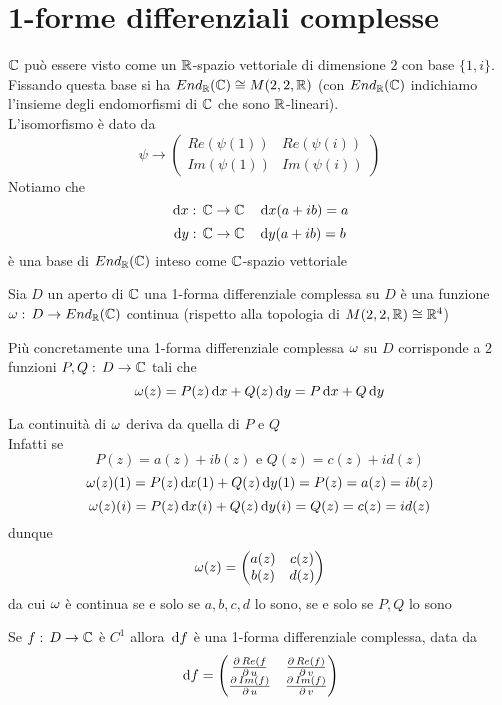 \section{1-forme differenziali complesse}
$\mathbb{C}$ pu\`o essere visto come un $\mathbb{R}$-spazio vettoriale di dimensione $2$ con base $\{ 1 , i\}$.\\
Fissando questa base si ha $End_{\mathbb{R}}(\mathbb{C})\cong M(2,2,\mathbb{R})$ (con $End_{\mathbb{R}}(\mathbb{C})$ indichiamo l'insieme degli endomorfismi di $\mathbb{C}$ che sono $\mathbb{R}$-lineari).\\
L'isomorfismo \`e dato da 
$$\psi \to \begin{pmatrix}
Re (\psi(1)) & Re (\psi(i)) \\
Im(\psi(1)) & Im(\psi(i))
\end{pmatrix}$$
Notiamo che 
$$\, \mathrm{d} x:\, \mathbb{C}\to \mathbb{C} \quad \, \mathrm{d} x(a+ib)=a$$
$$\mathrm{d}y:\, \mathbb{C}\to \mathbb{C} \quad \, \mathrm{d} y(a+ib)=b$$
\`e una base di $End_{\mathbb{R}}(\mathbb{C})$ inteso come $\mathbb{C}$-spazio vettoriale
\begin{defn}Sia $D$ un aperto di $\mathbb{C}$ una 1-forma differenziale complessa su $D$ \`e una funzione 
$\omega:\,D \to End_{\mathbb{R}}(\mathbb{C})$ continua (rispetto alla topologia di $M(2,2,\mathbb{R})\cong \mathbb{R}^4$)
\end{defn}
\begin{oss}Pi\`u concretamente una 1-forma differenziale complessa $\omega$ su $D$ corrisponde a $2$ funzioni $P,Q:\, D \to \mathbb{C}$ tali che 
$$\omega(z)=P(z)\, \mathrm{d} x + Q(z) \, \mathrm{d} y = P\, \mathrm{d} x + Q\, \mathrm{d} y $$
\end{oss}
\begin{oss}
La continuit\`a di $\omega$ deriva da quella di $P$ e $Q$ \\
Infatti se $$P(z) = a(z) + i b(z) \text{ e }  Q(z) = c(z) + i d(z)$$
$$\omega(z)(1) = P(z) \, \mathrm{d} x (1) + Q(z)\, \mathrm{d} y(1)  = P(z) = a(z)= i b(z)$$
$$\omega(z)(i) = P(z) \, \mathrm{d} x (i) + Q(z)\, \mathrm{d} y(i)  = Q(z) = c(z)= i d(z)$$ 
dunque 
$$\omega(z) =\begin{pmatrix}
a(z) & c(z) \\ b(z) & d(z) 
\end{pmatrix}$$ 
da cui $\omega$ \`e continua se e solo se $a,b,c,d$ lo sono, se e solo se $P,Q$ lo sono 
\end{oss}
\begin{ese}Se $f:\, D \to \mathbb{C}$ \`e $C^1$ allora $\, \mathrm{d} f $ \`e una 1-forma differenziale complessa, data da 
$$\, \mathrm{d} f =\begin{pmatrix}
 \frac{\partial \, Re(f}{\partial\, u} & \frac{\partial \, Re(f)}{\partial\, v} \\
 \frac{\partial \, Im(f)}{\partial\, u} & \frac{\partial \, Im(f)}{\partial\, v} 
\end{pmatrix}$$
\end{ese} 
